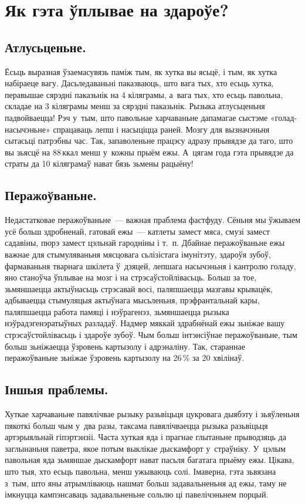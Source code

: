 \section{Як гэта ўплывае на здароўе?}

\subsection{Атлусьценьне.}
Ёсьць выразная ўзаемасувязь паміж тым, як хутка вы ясьцё, і тым, як хутка набіраеце вагу. Дасьледаваньні паказваюць, што вага тых, хто есьць хутка, перавышае сярэдні паказьнік на 4 кіляграмы, а~вага тых, хто есьць павольна, складае на 3 кіляграмы менш за сярэдні паказьнік. Рызыка атлусьценьня падвойваецца! Рэч у~тым, што павольнае харчаваньне дапамагае сыстэме «голад-насычэньне» спрацаваць лепш і насыціцца раней. Мозгу для вызначэньня сытасьці патрэбны час. Так, запаволеньне працэсу адразу прывядзе да таго, што вы зьясцё на 88\,ккал менш у~кожны прыём ежы. А~цягам года гэта прывядзе да страты да 10 кіляграмаў нават бязь зьмены рацыёну!

\subsection{Перажоўваньне.}
Недастатковае перажоўваньне~--- важная праблема фастфуду. Сёньня мы ўжываем усё больш здробненай, гатовай ежы~--- катлеты замест мяса, смузі замест садавіны, пюрэ замест цэльнай гародніны і т.~п. Дбайнае перажоўваньне ежы важнае для стымуляваньня мясцовага сьлізістага імунітэту, здароўя зубоў, фармаваньня тварнага шкілета ў~дзяцей, лепшага насычэньня і кантролю голаду, яно станоўча ўплывае на мозг і на стрэсаўстойлівасьць. Больш за тое, зьмяншаецца актыўнасьць стрэсавай восі, паляпшаецца мазгавы крывацёк, адбываецца стымуляцыя актыўнага мысьленьня, прэфрантальнай кары, паляпшаецца работа памяці і нэўрагенэз, зьмяншаецца рызыка нэўрадэгенэратыўных разладаў. Надмер мяккай здрабнёнай ежы зьніжае вашу стрэсаўстойлівасьць і здароўе зубоў. Чым больш інтэнсіўнае перажоўваньне, тым больш зьніжаецца ўзровень картызолу і адрэналіну. Так, стараннае перажоўваньне зьніжае ўзровень картызолу на 26\,\% за 20 хвілінаў.

\subsection{Іншыя праблемы.}
Хуткае харчаваньне павялічвае рызыку разьвіцьця цукровага дыябэту і зьяўленьня пякоткі больш чым у~два разы, таксама павялічваецца рызыка разьвіцьця артэрыяльнай гіпэртэнзіі. Часта хуткая яда і прагнае глытаньне прыводзяць да заглынаньня паветра, якое потым выклікае дыскамфорт у~страўніку. У~цэлым павольная яда зьмяншае дыскамфорт нават пасьля багатага прыёму ежы. Цікава, што тыя, хто есьць павольна, менш ужываюць солі. Імаверна, гэта зьвязана з~тым, што яны атрымліваюць нашмат больш задавальненьня ад ежы, таму не імкнуцца кампэнсаваць задавальненьне сольлю ці павелічэньнем порцый.

